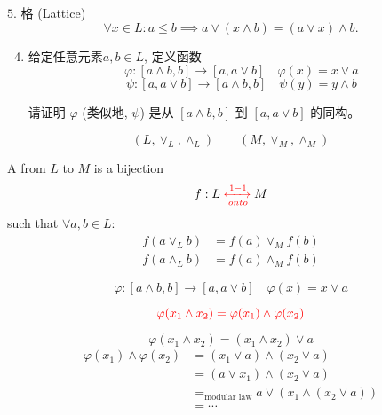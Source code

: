 \begin{frame}{}
  \begin{exampleblock}{$5.$ 格 (Lattice)}
    \[
      \forall x \in L: a \le b \implies a \lor (x \land b) = (a \lor x) \land b.
    \]

    \begin{enumerate}[(1)]
      \setcounter{enumi}{3}
      \item 给定任意元素$a, b \in L$, 定义函数
	\[
	  \varphi: [a \land b, b] \to [a, a \lor b]  \quad \varphi(x) = x \lor a
	\]
	\[
	  \psi: [a, a \lor b] \to [a \land b, b] \quad \psi(y) = y \land b
	\]

	请证明 $\varphi$ (类似地, $\psi$) 是从 $[a \land b, b]$ 到 $[a, a \lor b]$ 的同构。
	
    \end{enumerate}
  \end{exampleblock}
\end{frame}

\begin{frame}{}
  \begin{definition}
    \[
      (L, \lor_{L}, \land_{L})  \qquad (M, \lor_{M}, \land_{M})
    \]

    A  from $L$ to $M$ is a bijection
    \[
      f: L \textcolor{red}{\;\xleftrightarrow[onto]{1-1}\;} M
    \]
    such that $\forall a, b \in L$:
    \vspace{-0.30cm}
    \begin{align*}
      f(a \lor_{L} b) &= f(a) \lor_{M} f(b) \\
      f(a \land_{L} b) &= f(a) \land_{M} f(b)
    \end{align*}
  \end{definition}

  \pause
  \vspace{0.60cm}
  \centerline{}
\end{frame}

\begin{frame}{}
  \centerline{}
  \[
    \varphi: [a \land b, b] \to [a, a \lor b]  \quad \varphi(x) = x \lor a
  \]


  \pause
  \[
    \textcolor{red}{\varphi(x_1 \land x_2) = \varphi(x_1) \land \varphi(x_2)}
  \]

  \pause
  \[
    \varphi(x_1 \land x_2) = (x_1 \land x_2) \lor a
  \]
  \begin{align*}
    \varphi(x_1) \land \varphi(x_2) &= (x_1 \lor a) \land (x_2 \lor a) \\
    &= (a \lor x_1) \land (x_2 \lor a) \\
    &=_{\text{modular law}} a \lor (x_1 \land (x_2 \lor a)) \\
    &= \cdots
  \end{align*}
\end{frame}

